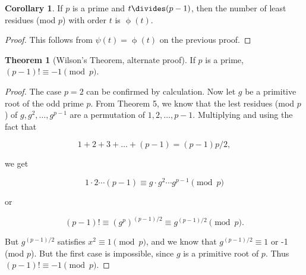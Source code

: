 \documentclass{article}
\theoremstyle{definition} %
\newtheorem{theorem}{Theorem}[section] %
\theoremstyle{definition}
\newtheorem{corollary}{Corollary}[section] %
\theoremstyle{definition}
\newcommand{\tot}{\upphi}
\theoremstyle{definition}
\begin{document}
  \begin{corollary}
    If $p$ is a prime and $t \divides (p - 1)$, then the number of least residues
    (mod $p$) with order $t$ is $\tot(t)$.
  \end{corollary}
  
  \begin{proof}
    This follows from $\psi(t) = \tot(t)$ on the previous proof.
  \end{proof}
  
  \begin{theorem}[Wilson's Theorem, alternate proof] If $p$ is a prime,
  $(p - 1)! \equiv -1 \pmod{p}$.
  \end{theorem}
  
  \begin{proof}
    The case $p = 2$ can be confirmed by calculation. Now let $g$ be a primitive
    root of the odd prime $p$. From Theorem 5, we know that
    the lest residues (mod $p$) of $g, g^2, \dots, g^{p - 1}$ are a permutation of $1,
    2, \dots, p - 1$. Multiplying and using the fact that
    
    \[ 1 + 2 + 3 + \dots + (p - 1) = (p - 1)p/2, \]
    
    we get
    
    \[ 1 \cdot 2 \cdots (p - 1) \equiv g \cdot g^2 \cdots g^{p - 1} \pmod{p} \]
    
    or
    
    \[ (p - 1)! \equiv (g^p)^{(p - 1)/2} \equiv g^{(p - 1)/2} \pmod{p}. \]
    
    But $g^{(p - 1)/2}$ satisfies $x^2 \equiv 1 \pmod{p}$, and we know that
    $g^{(p - 1)/2} \equiv 1$ or -1 (mod $p$). But the first case is impossible,
    since $g$ is a primitive root of $p$. Thus $(p - 1)! \equiv -1\pmod{p}$.
  \end{proof}
  
\end{document}
